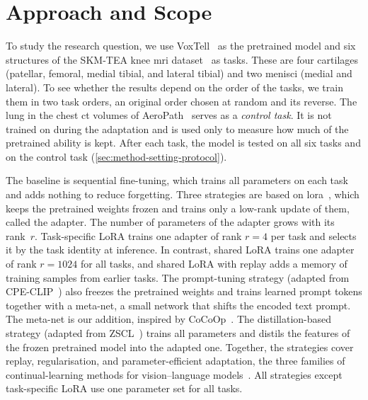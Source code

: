 \section{Approach and Scope}
\label{sec:intro-approach}

To study the research question, we use VoxTell~\cite{rokuss2025voxtellfreetextpromptableuniversal} as the pretrained model and six structures of the SKM-TEA knee \gls{mri} dataset~\cite{desai2021skmtea} as tasks.
These are four cartilages (patellar, femoral, medial tibial, and lateral tibial) and two menisci (medial and lateral).
To see whether the results depend on the order of the tasks, we train them in two task orders, an original order chosen at random and its reverse.
The lung in the chest \gls{ct} volumes of AeroPath~\cite{støverud2023aeropathairwaysegmentationbenchmark} serves as a \emph{control task}.
It is not trained on during the adaptation and is used only to measure how much of the pretrained ability is kept.
After each task, the model is tested on all six tasks and on the control task (\cref{sec:method-setting-protocol}).

The baseline is sequential fine-tuning, which trains all parameters on each task and adds nothing to reduce forgetting.
Three strategies are based on \gls{lora}~\cite{hu2022lora}, which keeps the pretrained weights frozen and trains only a low-rank update of them, called the adapter.
The number of parameters of the adapter grows with its rank~$r$.
Task-specific LoRA trains one adapter of rank $r = 4$ per task and selects it by the task identity at inference.
In contrast, shared LoRA trains one adapter of rank $r = 1024$ for all tasks, and shared LoRA with replay adds a memory of training samples from earlier tasks.
The prompt-tuning strategy (adapted from CPE-CLIP~\cite{D_Alessandro_2023}) also freezes the pretrained weights and trains learned prompt tokens together with a meta-net, a small network that shifts the encoded text prompt.
The meta-net is our addition, inspired by CoCoOp~\cite{zhou2022cocoop}.
The distillation-based strategy (adapted from ZSCL~\cite{zheng2023preventingzeroshottransferdegradation}) trains all parameters and distils the features of the frozen pretrained model into the adapted one.
Together, the strategies cover replay, regularisation, and parameter-efficient adaptation, the three families of continual-learning methods for vision--language models~\cite[Sec.~4]{liu2026continuallearningvlmssurvey}.
All strategies except task-specific LoRA use one parameter set for all tasks.

